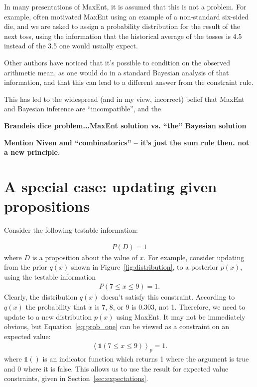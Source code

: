 \documentclass[a4paper, 11pt]{article}
\begin{document}
In many presentations of MaxEnt, it is assumed that this is not a problem.
For example, \citet{jaynes} often motivated MaxEnt using an example of a
non-standard six-sided die, and we are asked to assign a probability
distribution for the result of the next toss, using the information that the
historical average of the tosses is 4.5 instead of the 3.5 one would
usually expect.


Other authors have noticed that it's possible to
condition on the observed arithmetic mean, as one would do in a standard
Bayesian analysis of that information, and that this can lead to a different
answer from the constraint rule.


This has led to the widespread (and in my view, incorrect) belief that
MaxEnt and Bayesian inference are ``incompatible'', and the 

{\bf Brandeis dice problem...MaxEnt solution vs. ``the'' Bayesian solution}


{\bf Mention Niven and ``combinatorics'' -- it's just the sum rule then. not
a new principle}.

\section{A special case: updating given propositions}
Consider the following testable information:

\begin{eqnarray}
P(D) = 1
\end{eqnarray}
where $D$ is a proposition about the value of $x$. For example, consider
updating from the prior $q(x)$ shown in Figure~\ref{fig:distribution}, to
a posterior $p(x)$, using the testable information
\begin{eqnarray}
P(7 \leq x \leq 9) = 1.\label{eq:prob_one}
\end{eqnarray}
Clearly, the distribution $q(x)$ doesn't satisfy this constraint. According
to $q(x)$ the probability that $x$ is 7, 8, or 9 is 0.303, not 1.
Therefore, we
need to update to a new distribution $p(x)$ using MaxEnt. It may not be
immediately obvious, but Equation~\ref{eq:prob_one} can be viewed as
a constraint on an expected value:
\begin{eqnarray}
\left<
\mathds{1}\left(7 \leq x \leq 9\right)
\right>_p = 1.
\end{eqnarray}
where $\mathds{1}()$ is an indicator function which returns 1 where the
argument is true and 0 where it is false. This allows us to use the
result for expected value constraints, given in
Section~\ref{sec:expectations}.
\end{document}

